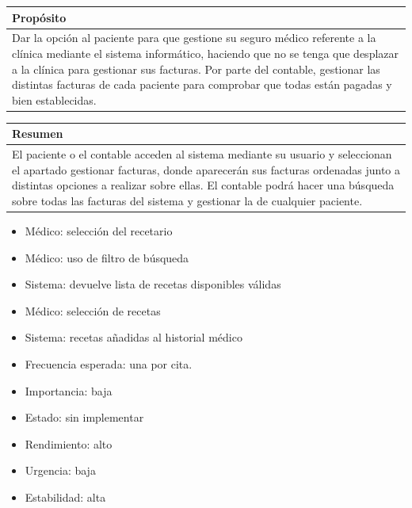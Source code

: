 \documentclass[11pt,a4paper]{article}
\begin{document}
\begin{table}[h]
	\centering
	\begin{tabular}{l}
		\hline
		\multicolumn{1}{|l|}{Propósito} \\ \hline
		Dar la opción al paciente para que gestione su seguro médico referente a la clínica mediante el sistema informático, haciendo que no se tenga que desplazar a la clínica para gestionar sus facturas. Por parte del contable, gestionar las distintas facturas de cada paciente para comprobar que todas están pagadas y bien establecidas.
	\end{tabular}
	
\end{table}

\begin{table}[h]
	\centering
	\begin{tabular}{l}
		\hline
		\multicolumn{1}{|l|}{Resumen} \\ \hline
		El paciente o el contable acceden al sistema mediante su usuario y seleccionan el apartado gestionar facturas, donde aparecerán sus facturas ordenadas junto a distintas opciones a realizar sobre ellas. El contable podrá hacer una búsqueda sobre todas las facturas del sistema y gestionar la de cualquier paciente.
	\end{tabular}
\end{table}



\begin{itemize}
	\item Médico: selección del recetario
	\item Médico: uso de filtro de búsqueda
	\item Sistema: devuelve lista de recetas disponibles válidas
	\item Médico: selección de recetas
	\item Sistema: recetas añadidas al historial médico
\end{itemize}


\begin{itemize}
	\item Frecuencia esperada: una por cita.
	\item Importancia: baja
	\item Estado: sin implementar
	\item Rendimiento: alto
	\item Urgencia: baja
	\item Estabilidad: alta
\end{itemize}
\end{document}
